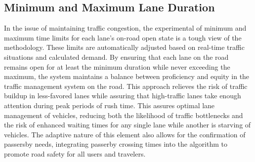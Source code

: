 \documentclass[conference]{IEEEtran}
\begin{document}
\subsection{Minimum and Maximum Lane Duration}
In the issue of maintaining traffic congestion, the experimental of minimum and maximum time limits for each lane's on-road open state is a tough view of the methodology. These limits are automatically adjusted based on real-time traffic situations and calculated demand. By ensuring that each lane on the road remains open for at least the minimum duration while never exceeding the maximum, the system maintains a balance between proficiency and equity in the traffic management system on the road. This approach relieves the risk of traffic buildup in less-favored lanes while assuring that high-traffic lanes take enough attention during peak periods of rush time. 
This assures optimal lane management of vehicles, reducing both the likelihood of traffic bottlenecks and the risk of enhanced waiting times for any single lane while another is starving of vehicles. The adaptive nature of this element also allows for the confirmation of passersby needs, integrating passerby crossing times into the algorithm to promote road safety for all users and travelers.
\end{document}
